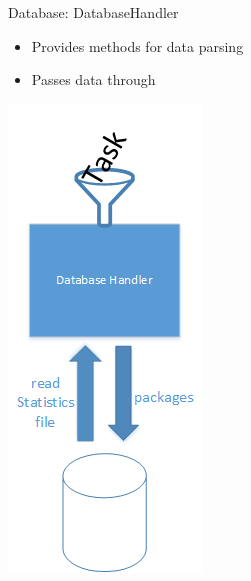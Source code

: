 	\begin{frame}{Database: DatabaseHandler}
	
	\begin{minipage}[]{.5\textwidth}%
	\begin{itemize}
		\item<1->{} {Provides methods for data parsing}
		\item<2->{} {Passes data through}
	\end{itemize}
	\end{minipage}	
	\begin{minipage}[]{.25\textwidth}%
	\vspace{-\ht\strutbox}\includegraphics[width=\textwidth]{images/zeichnunghandler.png}

\end{minipage}
\end{frame}
